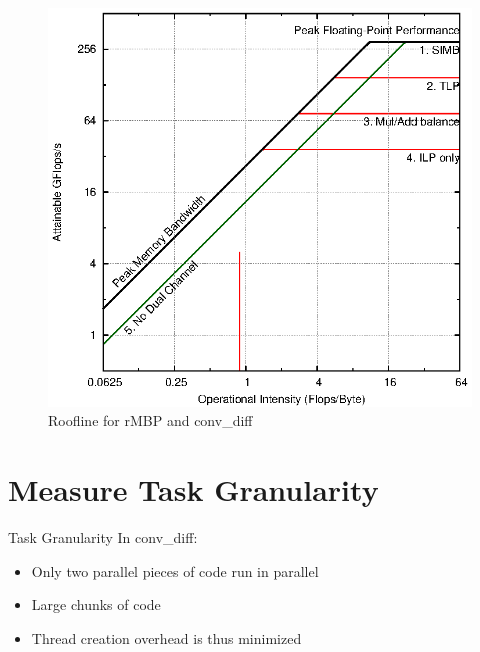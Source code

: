 \documentclass{beamer}
\begin{document}
\subsection{}
\begin{frame}[fragile]
		\begin{figure}[!htb]
			\centering
			\includegraphics[scale=.7]{roofline_mbp.eps}
			\caption{Roofline for rMBP and conv\_diff}
			\label{roofline}
		\end{figure}
\end{frame}


\section{Measure Task Granularity}

\begin{frame}[fragile]
	\begin{block}{Task Granularity}
		In conv\_diff:									
		\begin{itemize}
			\item Only two parallel pieces of code run in parallel
			\item Large chunks of code
			\item Thread creation overhead is thus minimized 
		\end{itemize}
	\end{block}
\end{frame}
\end{document}
